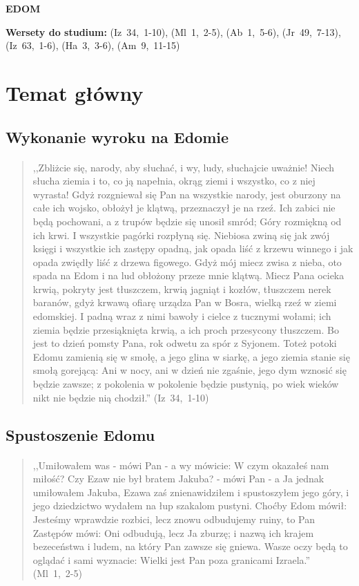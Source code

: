 \documentclass[10pt,a4paper,oneside]{article}
\begin{document}
\centerline{\textbf{\MakeUppercase{Edom}}}
\begin{center}
\textbf{Wersety do studium:} \mbox{(Iz 34, 1-10)}, \mbox{(Ml 1, 2-5)}, \mbox{(Ab 1, 5-6)}, \mbox{(Jr 49, 7-13)}, \mbox{(Iz 63, 1-6)}, \mbox{(Ha 3, 3-6)}, \mbox{(Am 9, 11-15)}
\end{center}
\section{Temat główny}
\subsection{Wykonanie wyroku na Edomie}
\paragraph{}
\begin{quote}
,,Zbliżcie się, narody, aby słuchać, i wy, ludy, słuchajcie uważnie! Niech słucha ziemia i to, co ją napełnia, okrąg ziemi i wszystko, co z niej wyrasta! Gdyż rozgniewał się Pan na wszystkie narody, jest oburzony na całe ich wojsko, obłożył je klątwą, przeznaczył je na rzeź. Ich zabici nie będą pochowani, a z trupów będzie się unosił smród; Góry rozmiękną od ich krwi. I wszystkie pagórki rozpłyną się. Niebiosa zwiną się jak zwój księgi i wszystkie ich zastępy opadną, jak opada liść z krzewu winnego i jak opada zwiędły liść z drzewa figowego. Gdyż mój miecz zwisa z nieba, oto spada na Edom i na lud obłożony przeze mnie klątwą. Miecz Pana ocieka krwią, pokryty jest tłuszczem, krwią jagniąt i kozłów, tłuszczem nerek baranów, gdyż krwawą ofiarę urządza Pan w Bosra, wielką rzeź w ziemi edomskiej. I padną wraz z nimi bawoły i cielce z tucznymi wołami; ich ziemia będzie przesiąknięta krwią, a ich proch przesycony tłuszczem. Bo jest to dzień pomsty Pana, rok odwetu za spór z Syjonem. Toteż potoki Edomu zamienią się w smołę, a jego glina w siarkę, a jego ziemia stanie się smołą gorejącą: Ani w nocy, ani w dzień nie zgaśnie, jego dym wznosić się będzie zawsze; z pokolenia w pokolenie będzie pustynią, po wiek wieków nikt nie będzie nią chodził.'' \mbox{(Iz 34, 1-10)}
\end{quote}
\subsection{Spustoszenie Edomu}
\paragraph{}
\begin{quote}
,,Umiłowałem was - mówi Pan - a wy mówicie: W czym okazałeś nam miłość? Czy Ezaw nie był bratem Jakuba? - mówi Pan - a Ja jednak umiłowałem Jakuba, Ezawa zaś znienawidziłem i spustoszyłem jego góry, i jego dziedzictwo wydałem na łup szakalom pustyni. Choćby Edom mówił: Jesteśmy wprawdzie rozbici, lecz znowu odbudujemy ruiny, to Pan Zastępów mówi: Oni odbudują, lecz Ja zburzę; i nazwą ich krajem bezeceństwa i ludem, na który Pan zawsze się gniewa. Wasze oczy będą to oglądać i sami wyznacie: Wielki jest Pan poza granicami Izraela.'' \mbox{(Ml 1, 2-5)}
\end{quote}
\end{document}
